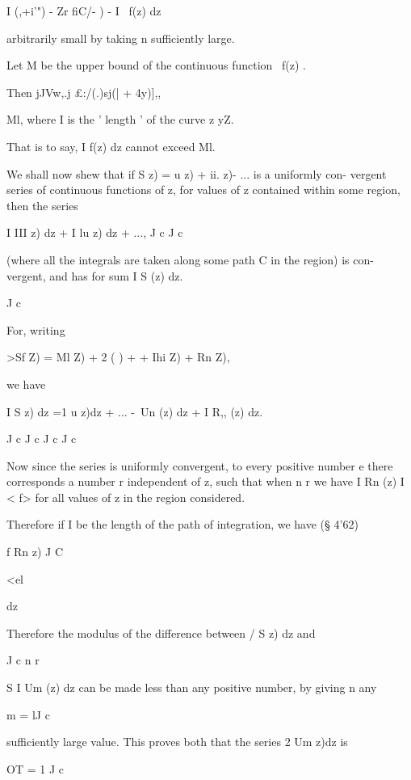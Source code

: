 I (,+i'") - Zr fiC/- ) - I \ f(z) dz

arbitrarily small by taking n sufficiently large.


Let M be the upper bound of the continuous function \ f(z) .

Then jJVw,.j £:/(.)sj(| + 4y)],,

 Ml, where I is the ' length ' of the curve z yZ.

That is to say, I f(z) dz cannot exceed Ml.


We shall now shew that if S z) = u z) + ii. z)- ... is a uniformly
con- vergent series of continuous functions of z, for values of z
contained within some region, then the series

I III z) dz + I lu z) dz + ..., J c J c

(where all the integrals are taken along some path C in the region) is
con- vergent, and has for sum I S (z) dz.

J c

%
%

For, writing

>Sf Z) = Ml Z) + 2 ( ) +    + Ihi Z) + Rn Z),

we have

I S z) dz =1 u z)dz + ... -\ Un (z) dz + I R,, (z) dz.

J c J c J c J c

Now since the series is uniformly convergent, to every positive number
e there corresponds a number r independent of z, such that when n r we
have I Rn (z) I < f> for all values of z in the region considered.

Therefore if I be the length of the path of integration, we have (§
4'62)

f Rn z) J C

<el

dz

Therefore the modulus of the difference between / S z) dz and

J c n r

S I Um (z) dz can be made less than any positive number, by giving n
any

m = lJ c

sufficiently large value. This proves both that the series 2 Um z)dz
is

OT = 1 J c

